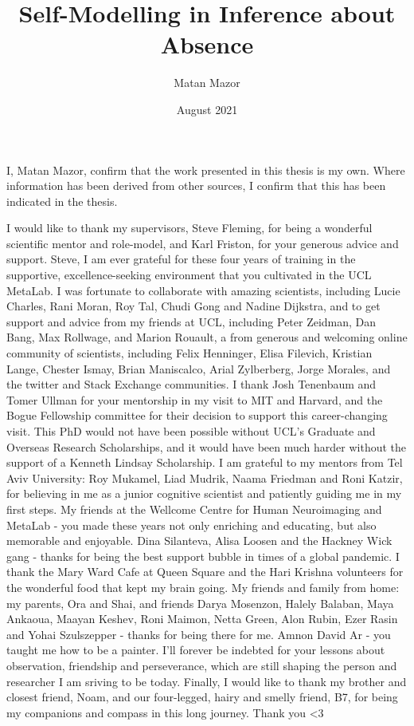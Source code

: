 \documentclass[12pt,twoside]{reedthesis}
\title{Self-Modelling in Inference about Absence}
\author{Matan Mazor}
\date{August 2021}
\begin{document}
  \maketitle

\frontmatter %
\pagestyle{empty} %
  \begin{declaration}
    I, Matan Mazor, confirm that the work presented in this thesis is my own. Where information has been derived from other sources, I confirm that this has been indicated in the thesis.
  \end{declaration}
  \begin{acknowledgements}
    I would like to thank my supervisors, Steve Fleming, for being a wonderful scientific mentor and role-model, and Karl Friston, for your generous advice and support. Steve, I am ever grateful for these four years of training in the supportive, excellence-seeking environment that you cultivated in the UCL MetaLab. I was fortunate to collaborate with amazing scientists, including Lucie Charles, Rani Moran, Roy Tal, Chudi Gong and Nadine Dijkstra, and to get support and advice from my friends at UCL, including Peter Zeidman, Dan Bang, Max Rollwage, and Marion Rouault, a from generous and welcoming online community of scientists, including Felix Henninger, Elisa Filevich, Kristian Lange, Chester Ismay, Brian Maniscalco, Arial Zylberberg, Jorge Morales, and the twitter and Stack Exchange communities. I thank Josh Tenenbaum and Tomer Ullman for your mentorship in my visit to MIT and Harvard, and the Bogue Fellowship committee for their decision to support this career-changing visit. This PhD would not have been possible without UCL's Graduate and Overseas Research Scholarships, and it would have been much harder without the support of a Kenneth Lindsay Scholarship. I am grateful to my mentors from Tel Aviv University: Roy Mukamel, Liad Mudrik, Naama Friedman and Roni Katzir, for believing in me as a junior cognitive scientist and patiently guiding me in my first steps. My friends at the Wellcome Centre for Human Neuroimaging and MetaLab - you made these years not only enriching and educating, but also memorable and enjoyable. Dina Silanteva, Alisa Loosen and the Hackney Wick gang - thanks for being the best support bubble in times of a global pandemic. I thank the Mary Ward Cafe at Queen Square and the Hari Krishna volunteers for the wonderful food that kept my brain going. My friends and family from home: my parents, Ora and Shai, and friends Darya Mosenzon, Halely Balaban, Maya Ankaoua, Maayan Keshev, Roni Maimon, Netta Green, Alon Rubin, Ezer Rasin and Yohai Szulszepper - thanks for being there for me. Amnon David Ar - you taught me how to be a painter. I'll forever be indebted for your lessons about observation, friendship and perseverance, which are still shaping the person and researcher I am sriving to be today. Finally, I would like to thank my brother and closest friend, Noam, and our four-legged, hairy and smelly friend, B7, for being my companions and compass in this long journey. Thank you \textless3
  \end{acknowledgements}
\end{document}
